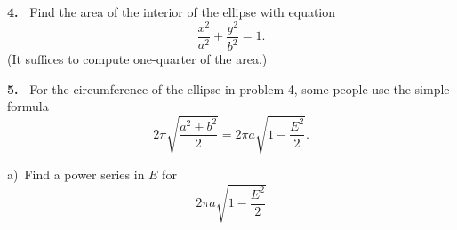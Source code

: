 \documentclass[12pt]{article}
\theoremstyle{definition}
\theoremstyle{remark}
\theoremstyle{definition}
\newenvironment{Solution}{\noindent\textbf{Solution.}}{}
\DeclareMathOperator{\erf}{erf}
\begin{document}






{\bf 4.\ } Find the area of the interior of the ellipse with equation 
\[\frac{x^2}{a^2}+\frac{y^2}{b^2}=1.\]
(It suffices to compute one-quarter of the area.)


{\bf 5.\ } For the circumference of the ellipse in problem 4, some people use the simple formula 
\[
2\pi\sqrt{\frac{a^2+b^2}{2}}=2\pi a\sqrt{1-\frac{E^2}{2}}.
\]

a)\ Find a power series in $E$ for 
\[2\pi a\sqrt{1-\frac{E^2}{2}}\]
\end{document}
